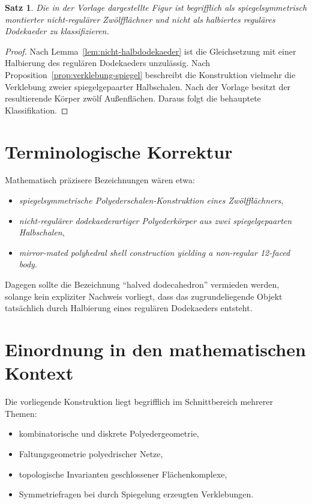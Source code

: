 \documentclass[11pt]{article}
\theoremstyle{plain}
\newtheorem{satz}{Satz}
\theoremstyle{definition}
\theoremstyle{remark}
\begin{document}
	\begin{satz}\label{thm:haupteinordnung}
		Die in der Vorlage dargestellte Figur ist begrifflich als spiegelsymmetrisch montierter nicht-regulärer Zwölfflächner und nicht als halbiertes reguläres Dodekaeder zu klassifizieren.
	\end{satz}
	
	\begin{proof}
		Nach Lemma~\ref{lem:nicht-halbdodekaeder} ist die Gleichsetzung mit einer Halbierung des regulären Dodekaeders unzulässig. Nach Proposition~\ref{prop:verklebung-spiegel} beschreibt die Konstruktion vielmehr die Verklebung zweier spiegelgepaarter Halbschalen. Nach der Vorlage besitzt der resultierende Körper zwölf Außenflächen. Daraus folgt die behauptete Klassifikation.
	\end{proof}
	
	\section{Terminologische Korrektur}
	
	Mathematisch präzisere Bezeichnungen wären etwa:
	\begin{itemize}
		\item \emph{spiegelsymmetrische Polyederschalen-Konstruktion eines Zwölfflächners},
		\item \emph{nicht-regulärer dodekaederartiger Polyederkörper aus zwei spiegelgepaarten Halbschalen},
		\item \emph{mirror-mated polyhedral shell construction yielding a non-regular 12-faced body}.
	\end{itemize}
	
	Dagegen sollte die Bezeichnung \enquote{halved dodecahedron} vermieden werden, solange kein expliziter Nachweis vorliegt, dass das zugrundeliegende Objekt tatsächlich durch Halbierung eines regulären Dodekaeders entsteht.
	
	\section{Einordnung in den mathematischen Kontext}
	
	Die vorliegende Konstruktion liegt begrifflich im Schnittbereich mehrerer Themen:
	\begin{itemize}
		\item kombinatorische und diskrete Polyedergeometrie,
		\item Faltungsgeometrie polyedrischer Netze,
		\item topologische Invarianten geschlossener Flächenkomplexe,
		\item Symmetriefragen bei durch Spiegelung erzeugten Verklebungen.
	\end{itemize}
	
\end{document}
